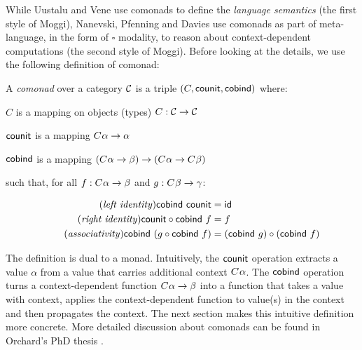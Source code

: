 While Uustalu and Vene use comonads to define the \emph{language semantics} (the first style
of Moggi), Nanevski, Pfenning and Davies use comonads as part of meta-language, in the form
of $\square$ modality, to reason about context-dependent computations (the second style of
Moggi). Before looking at the details, we use the following definition of comonad:
%
\begin{definition}
A \emph{comonad} over a category $\mathcal{C}$ is a triple $(C, \textnormal{\sffamily counit}, \textnormal{\sffamily cobind})$ where:
\begin{compactitem}
\item $C$ is a mapping on objects (types) $C : \mathcal{C} \rightarrow \mathcal{C}$
\item $\textnormal{\sffamily counit}$ is a mapping $C^{}\alpha \rightarrow \alpha$
\item $\textnormal{\sffamily cobind}$ is a mapping $(C^{}\alpha \rightarrow \beta)
  \rightarrow (C^{}\alpha \rightarrow C^{}\beta)$
\end{compactitem}
%
such that, for all $f:C^{}\alpha \rightarrow \beta$ and $g:C^{}\beta \rightarrow \gamma$:

\begin{align}
\tag{\emph{left identity}}
  \ident{cobind}~\ident{counit} &= \idf{}
  \\
\tag{\emph{right identity}}
  \ident{counit} \circ \ident{cobind}~f &= f
  \\
\tag{\emph{associativity}}
  \ident{cobind}~(g \circ \ident{cobind}~f) &= (\ident{cobind}~g) \circ (\ident{cobind}~f)
\end{align}
\end{definition}

\noindent
The definition is dual to a monad. Intuitively, the $\textnormal{\sffamily counit}$
operation extracts a value $\alpha$ from a value that carries additional context $C^{}\alpha$.
The $\textnormal{\sffamily cobind}$ operation turns a context-dependent function
$C^{}\alpha \rightarrow \beta$ into a function that takes a value with context, applies
the context-dependent function to value(s) in the context and then propagates the context. The
next section makes this intuitive definition more concrete. More detailed discussion about
comonads can be found in Orchard's PhD thesis \cite{comonads-dom-thesis}.


